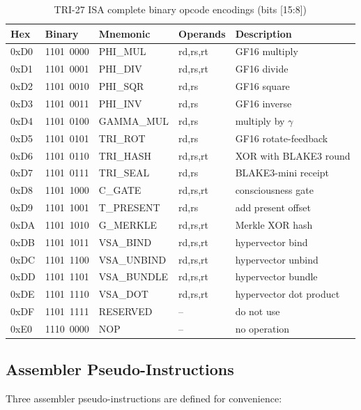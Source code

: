 \begin{table}[H]
\centering
\caption{TRI-27 ISA complete binary opcode encodings (bits [15:8])}
\label{tab:71:opcode-binary}
\small
\begin{tabular}{lllll}
\toprule
Hex  & Binary     & Mnemonic     & Operands & Description \\
\midrule
0xD0 & 1101\ 0000 & PHI\_MUL    & rd,rs,rt & GF16 multiply \\
0xD1 & 1101\ 0001 & PHI\_DIV    & rd,rs,rt & GF16 divide \\
0xD2 & 1101\ 0010 & PHI\_SQR    & rd,rs    & GF16 square \\
0xD3 & 1101\ 0011 & PHI\_INV    & rd,rs    & GF16 inverse \\
0xD4 & 1101\ 0100 & GAMMA\_MUL  & rd,rs    & multiply by $\gamma$ \\
0xD5 & 1101\ 0101 & TRI\_ROT    & rd,rs    & GF16 rotate-feedback \\
0xD6 & 1101\ 0110 & TRI\_HASH   & rd,rs,rt & XOR with BLAKE3 round \\
0xD7 & 1101\ 0111 & TRI\_SEAL   & rd,rs    & BLAKE3-mini receipt \\
0xD8 & 1101\ 1000 & C\_GATE     & rd,rs,rt & consciousness gate \\
0xD9 & 1101\ 1001 & T\_PRESENT  & rd,rs    & add present offset \\
0xDA & 1101\ 1010 & G\_MERKLE   & rd,rs,rt & Merkle XOR hash \\
0xDB & 1101\ 1011 & VSA\_BIND   & rd,rs,rt & hypervector bind \\
0xDC & 1101\ 1100 & VSA\_UNBIND & rd,rs,rt & hypervector unbind \\
0xDD & 1101\ 1101 & VSA\_BUNDLE & rd,rs,rt & hypervector bundle \\
0xDE & 1101\ 1110 & VSA\_DOT    & rd,rs,rt & hypervector dot product \\
0xDF & 1101\ 1111 & RESERVED    & --       & do not use \\
0xE0 & 1110\ 0000 & NOP         & --       & no operation \\
\bottomrule
\end{tabular}
\end{table}

\subsection{Assembler Pseudo-Instructions}
\label{subsec:71:pseudo-instrs}

Three assembler pseudo-instructions are defined for convenience:

